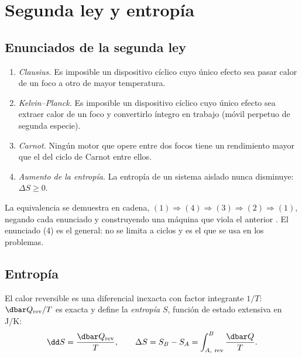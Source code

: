 \section{Segunda ley y entropía}

\subsection{Enunciados de la segunda ley}

\begin{teorema}
\begin{enumerate}[leftmargin=1.6em,label=(\arabic*)]
\item \emph{Clausius.} Es imposible un dispositivo cíclico cuyo único efecto sea pasar calor de un foco a otro
  de mayor temperatura.
\item \emph{Kelvin--Planck.} Es imposible un dispositivo cíclico cuyo único efecto sea extraer calor de un foco
  y convertirlo íntegro en trabajo (móvil perpetuo de segunda especie).
\item \emph{Carnot.} Ningún motor que opere entre dos focos tiene un rendimiento mayor que el del ciclo de
  Carnot entre ellos.
\item \emph{Aumento de la entropía.} La entropía de un sistema aislado nunca disminuye: $\Delta S\geq0$.
\end{enumerate}
\end{teorema}

La equivalencia se demuestra en cadena, $(1)\Rightarrow(4)\Rightarrow(3)\Rightarrow(2)\Rightarrow(1)$, negando
cada enunciado y construyendo una máquina que viola el anterior \cite{gonzalez1}. El enunciado (4) es el
general: no se limita a ciclos y es el que se usa en los problemas.

\subsection{Entropía}

\begin{definicion}[Entropía]
El calor reversible es una diferencial inexacta con factor integrante $1/T$: $\dbar Q_{\mathrm{rev}}/T$ es
exacta y define la \emph{entropía} $S$, función de estado extensiva en \si{J/K}:
\begin{equation}\label{eq:dS}
  \dd S=\frac{\dbar Q_{\mathrm{rev}}}{T},\qquad
  \Delta S=S_B-S_A=\int_{A,\ \mathrm{rev}}^{B}\frac{\dbar Q}{T}.
\end{equation}
\end{definicion}

